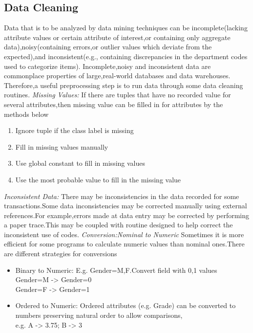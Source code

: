 \subsection{Data Cleaning}
Data that is to be analyzed by data mining techniques can be incomplete(lacking attribute values or certain attribute of interest,or containing only aggregate data),noisy(containing errors,or outlier values which deviate from the expected),and inconsistent(e.g., containing discrepancies in the department codes used to categorize items). \cite{data cleaning}Incomplete,noisy and inconsistent data are commonplace properties of large,real-world databases and data warehouses.\\Therefore,a useful preprocessing step is to run data through some data cleaning routines.
\textit{Missing Values:}
If there are tuples that have no recorded value for several attributes,then missing value can be filled  in for attributes by the methods below
\begin{enumerate}
  \item Ignore tuple if the class label is missing
  \item Fill in missing values manually 
  \item Use global constant to fill in missing values
  \item Use the most probable value to fill in the missing value
\end{enumerate}
\textit{Inconsistent Data:}
There may be inconsistencies in the data recorded for some transactions.Some data inconsistencies may be corrected manually using external references.For example,errors made at data entry may be corrected by performing a paper trace.This may be coupled with routine designed to help correct the inconsistent use of codes.
\textit{Conversion:Nominal to Numeric}
Sometimes it is more efficient for some programs to calculate numeric values than nominal ones.There are different strategies for conversions

\begin{itemize}
  \item Binary to Numeric: E.g. Gender=M,F.Convert field with 0,1 values
   \\Gender=M -\textgreater \vspace{10 mm} Gender=0
   \\Gender=F -\textgreater  \vspace{10 mm} Gender=1
\item Ordered to Numeric: Ordered attributes (e.g. Grade) can be converted to 
numbers preserving natural order to allow comparisons, \\e.g.
   A \vspace{10 mm} -\textgreater \vspace{10 mm} 3.75; \vspace{20 mm}
   B \vspace{10 mm} -\textgreater  \vspace{10 mm} 3
 
\end{itemize}

